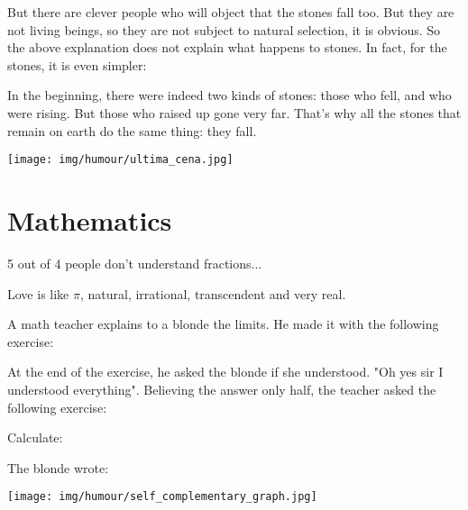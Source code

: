 But there are clever people who will object that the stones fall too. But they are not living beings, so they are not subject to natural selection, it is obvious. So the above explanation does not explain what happens to stones. In fact, for the stones, it is even simpler:

In the beginning, there were indeed two kinds of stones: those who fell, and who were rising. But those who raised up gone very far. That's why all the stones that remain on earth do the same thing: they fall.

\begin{center}\underline{\hspace{5 cm}}\end{center}

	\begin{center}
		\texttt{[image: img/humour/ultima\_cena.jpg]}	
	\end{center}

	\pagebreak
	\section{Mathematics}

5 out of 4 people don't understand fractions...
	\begin{center}\underline{\hspace{5 cm}}\end{center}

Love is like $\pi$, natural, irrational, transcendent and very real.
	\begin{center}\underline{\hspace{5 cm}}\end{center}

A math teacher explains to a blonde the limits. He made it with the following exercise:
	
At the end of the exercise, he asked the blonde if she understood. "Oh yes sir I understood everything". Believing the answer only half, the teacher asked the following exercise:

Calculate:
	
The blonde wrote: 
	
	\begin{center}\underline{\hspace{5 cm}}\end{center}
	
	\begin{center}
		\texttt{[image: img/humour/self\_complementary\_graph.jpg]}	
	\end{center}
	
